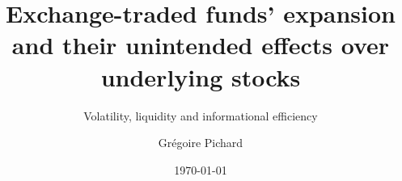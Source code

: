 \documentclass[a4paper, twoside, 10pt, titlepage, captions = tableheading]{scrartcl}
\title{Exchange-traded funds' expansion and their unintended effects over underlying stocks}
\subtitle{Volatility, liquidity and informational efficiency}
\date{\today}
\author{Grégoire Pichard}
\begin{document}
\maketitle
\renewcommand{\sectionautorefname}{Section}
\tableofcontents
\listoftables
\listoffigures
\clearpage







\clearpage
\printbibliography
\end{document}
